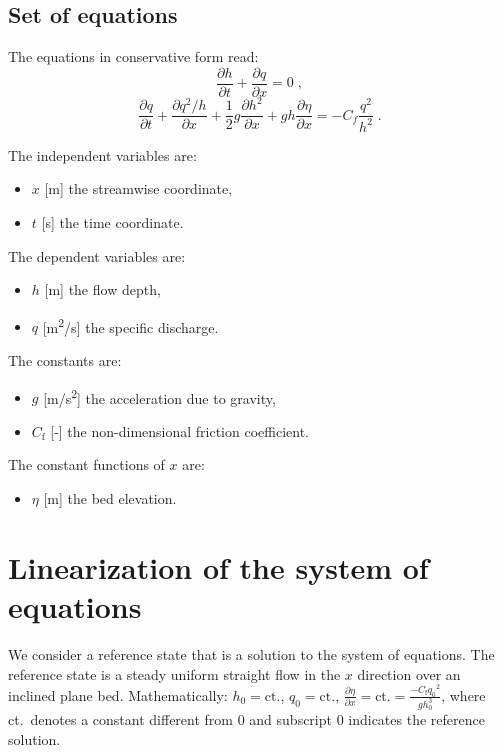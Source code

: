 \documentclass{deltares_report_elv}
\newcommand{\mathsub}[2]{#1_{\mathrm{#2}}}
\begin{document}
\subsection{Set of equations}

The \citet{SaintVenant71} equations in conservative form read:
\begin{equation}
\label{eq:sv_mass}
\frac{\partial h}{\partial t}+\frac{\partial q}{\partial x}=0 \;,
\end{equation}
\begin{equation}
\label{eq:sv_mom}
\frac{\partial q}{\partial t}+\frac{\partial q^2/h}{\partial x}+\frac{1}{2}g\frac{\partial h^2}{\partial x}+gh\frac{\partial \eta}{\partial x}=-C_f\frac{q^2}{h^2} \;.
\end{equation}

The independent variables are:
\begin{itemize}
\item $x$ [\si{m}] the streamwise coordinate,
\item $t$ [\si{s}] the time coordinate.
\end{itemize}

The dependent variables are:
\begin{itemize}
\item $h$ [\si{m}] the flow depth,
\item $q$ [\si{m^2/s}] the specific discharge.
\end{itemize}

The constants are:
\begin{itemize}
\item $g$ [\si{m/s^2}] the acceleration due to gravity,
\item $\mathsub{C}{f}$ [-] the non-dimensional friction coefficient.
\end{itemize}

The constant functions of $x$ are:
\begin{itemize}
\item $\eta$ [\si{m}] the bed elevation. 
\end{itemize}

\section{Linearization of the system of equations}

We consider a reference state that is a solution to the system of equations. The reference state is a steady uniform straight flow in the $x$ direction over an inclined plane bed. Mathematically: $h_0=\text{ct.}$, $q_0=\text{ct.}$, $\frac{\partial \eta}{\partial x}=\text{ct.}=\frac{-\mathsub{C}{f}{q_0}^2}{gh_0^3}$, where ct.\ denotes a constant different from 0 and subscript $0$ indicates the reference solution. 
\end{document}
